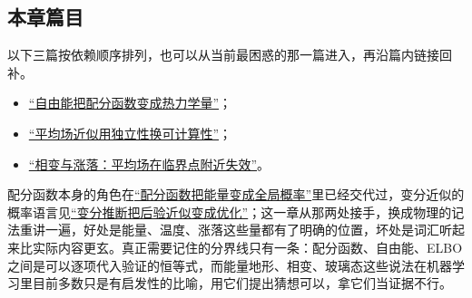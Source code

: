 \subsection{本章篇目}

以下三篇按依赖顺序排列，也可以从当前最困惑的那一篇进入，再沿篇内链接回补。

\begin{itemize}
\tightlist
\item \hyperref[sec:13-Machine-Learning/13-Statistical-Physics-and-Free-Energy/01]{``自由能把配分函数变成热力学量''}；
\item \hyperref[sec:13-Machine-Learning/13-Statistical-Physics-and-Free-Energy/02]{``平均场近似用独立性换可计算性''}；
\item \hyperref[sec:13-Machine-Learning/13-Statistical-Physics-and-Free-Energy/03]{``相变与涨落：平均场在临界点附近失效''}。
\end{itemize}

配分函数本身的角色在\hyperref[sec:13-Machine-Learning/08-Sampling-and-Inference/06]{``配分函数把能量变成全局概率''}里已经交代过，变分近似的概率语言见\hyperref[sec:13-Machine-Learning/08-Sampling-and-Inference/03]{``变分推断把后验近似变成优化''}；这一章从那两处接手，换成物理的记法重讲一遍，好处是能量、温度、涨落这些量都有了明确的位置，坏处是词汇听起来比实际内容更玄。真正需要记住的分界线只有一条：配分函数、自由能、ELBO 之间是可以逐项代入验证的恒等式，而能量地形、相变、玻璃态这些说法在机器学习里目前多数只是有启发性的比喻，用它们提出猜想可以，拿它们当证据不行。
